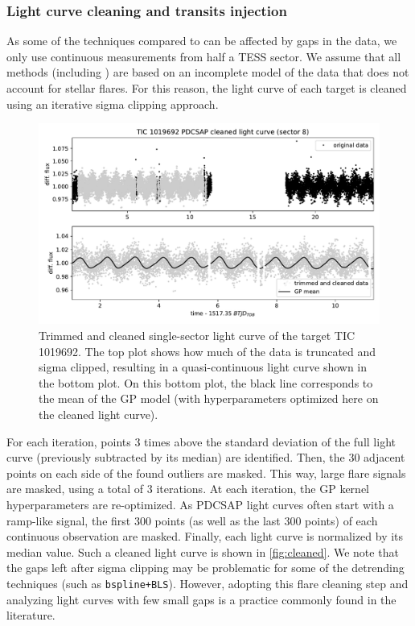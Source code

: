\documentclass[modern]{aastex631}
\begin{document}
\subsubsection*{Light curve cleaning and transits injection}
As some of the techniques compared to \nuance{} can be affected by gaps in the data, we only use continuous measurements from half a TESS sector. We assume that all methods (including \nuance{}) are based on an incomplete model of the data that does not account for stellar flares. For this reason, the light curve of each target is cleaned using an iterative sigma clipping approach.
\begin{figure}[H]
    \centering
    \includegraphics[width=\linewidth]{cleaned_1019692.pdf}
    \caption{Trimmed and cleaned single-sector light curve of the target TIC 1019692. The top plot shows how much of the data is truncated and sigma clipped, resulting in a quasi-continuous light curve shown in the bottom plot. On this bottom plot, the black line corresponds to the mean of the GP model (with hyperparameters optimized here on the cleaned light curve). }
    \label{fig:cleaned}
\end{figure}
For each iteration, points 3 times above the standard deviation of the full light curve (previously subtracted by its median) are identified. Then, the 30 adjacent points on each side of the found outliers are masked. This way, large flare signals are masked, using a total of 3 iterations. At each iteration, the GP kernel hyperparameters are re-optimized. As PDCSAP light curves often start with a ramp-like signal, the first 300 points (as well as the last 300 points) of each continuous observation are masked. Finally, each light curve is normalized by its median value. Such a cleaned light curve is shown in \autoref{fig:cleaned}. We note that the gaps left after sigma clipping may be problematic for some of the detrending techniques (such as \texttt{bspline+BLS}). However, adopting this flare cleaning step and analyzing light curves with few small gaps is a practice commonly found in the literature.\\\\
\end{document}
